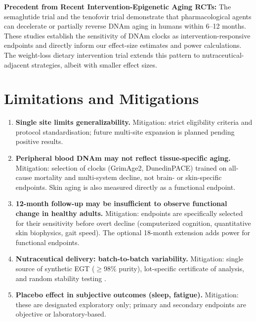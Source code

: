 \documentclass[11pt,a4paper]{article}
\begin{document}
\textbf{Precedent from Recent Intervention-Epigenetic Aging RCTs:}
The semaglutide trial \cite{corley2025} and the tenofovir trial \cite{anderson2026} demonstrate that pharmacological agents can decelerate or partially reverse DNAm aging in humans within 6--12 months. These studies establish the sensitivity of DNAm clocks as intervention-responsive endpoints and directly inform our effect-size estimates and power calculations. The weight-loss dietary intervention trial \cite{kou2025} extends this pattern to nutraceutical-adjacent strategies, albeit with smaller effect sizes.

\section{Limitations and Mitigations}

\begin{enumerate}[nosep]
  \item \textbf{Single site limits generalizability.} Mitigation: strict eligibility criteria and protocol standardisation; future multi-site expansion is planned pending positive results.
  \item \textbf{Peripheral blood DNAm may not reflect tissue-specific aging.} Mitigation: selection of clocks (GrimAge2, DunedinPACE) trained on all-cause mortality and multi-system decline, not brain- or skin-specific endpoints. Skin aging is also measured directly as a functional endpoint.
  \item \textbf{12-month follow-up may be insufficient to observe functional change in healthy adults.} Mitigation: endpoints are specifically selected for their sensitivity before overt decline (computerized cognition, quantitative skin biophysics, gait speed). The optional 18-month extension adds power for functional endpoints.
  \item \textbf{Nutraceutical delivery: batch-to-batch variability.} Mitigation: single source of synthetic EGT ($\geq$98\% purity), lot-specific certificate of analysis, and random stability testing \cite{gurley2021}.
  \item \textbf{Placebo effect in subjective outcomes (sleep, fatigue).} Mitigation: these are designated exploratory only; primary and secondary endpoints are objective or laboratory-based.
\end{enumerate}
\end{document}
